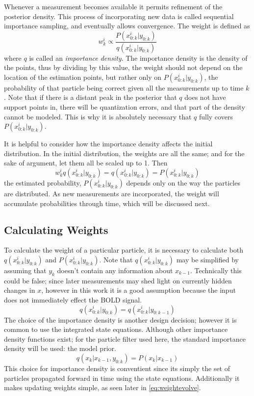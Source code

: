 Whenever a measurement becomes available it permits refinement of the
posterior density.
This process of incorporating new data is called sequential importance sampling,
and eventually allows convergence. The weight is defined as
\begin{equation}
w^i_k \propto \frac{P(x^i_{0:k} | y_{0:k})}{q(x^i_{0:k} | y_{0:k})}
\label{eq:weightfunc}
\end{equation}
where $q$ is called an \emph{importance density}. The importance density
is the density of the points, thus by dividing by this value, the weight
should not depend on the location of the estimation points, but rather
only on $P(x^i_{0:k} | y_{0:k})$, the probability of that particle
being correct given all the measurements up to time $k$. 
Note that if there is a distant peak in
the posterior that $q$ does not have support points in, there will 
be quantization errors, and that part of the density cannot be modeled. 
This is why it is absolutely necessary that $q$ fully covers 
$P(x^i_{0:k} | y_{0:k})$.

It is helpful
to consider how the importance density affects the initial distribution. 
In the initial distribution, the weights are all the same; and for
the sake of argument, let them all be scaled up to 1. Then
\begin{equation}
w^i_k q(x^i_{0:k} | y_{0:k}) = q(x^i_{0:k} | y_{0:k}) = P(x^i_{0:k} | y_{0:k})
\end{equation}
the estimated probability, $P(x^i_{0:k} | y_{0:k})$ depends only on the 
way the particles are distributed. As new measurements are incorporated,
the weight will accumulate probabilities through time, which will be discussed
next. 

\subsection{Calculating Weights}
To calculate the weight of a particular particle, it is necessary to 
calculate both $q(x^i_{0:k} | y_{0:k})$ and $P(x^i_{0:k} | y_{0:k})$.
Note that $q(x^i_{0:k} | y_{0:k})$ may be simplified by assuming that 
$y_k$ doesn't contain any information about $x_{k-1}$. Technically this 
could be false; since later measurements may shed light on currently hidden
changes in $x$, however in this work it is a good assumption because the
input does not immediately effect the BOLD signal. 
\begin{equation}
q(x^i_{0:k} | y_{0:k}) = q(x^i_{0:k} | y_{0:k-1})
\label{eq:QAssump}
\end{equation}
The choice of the importance density is another design decision; however
it is common to use the integrated state equations. 
Although other importance density functions exist; for the particle filter
used here, the standard importance density will be used: the model
prior.
\begin{equation}
q(x_k | x_{k-1}, y_{0:k}) =  P(x_k | x_{k-1})
\label{eq:ImportanceDensity}
\end{equation}
This choice for importance density is conventient since its simply 
the set of particles propagated
forward in time using the state equations. Additionally it makes
updating weights simple, as seen later in \autoref{eq:weightevolve}.

